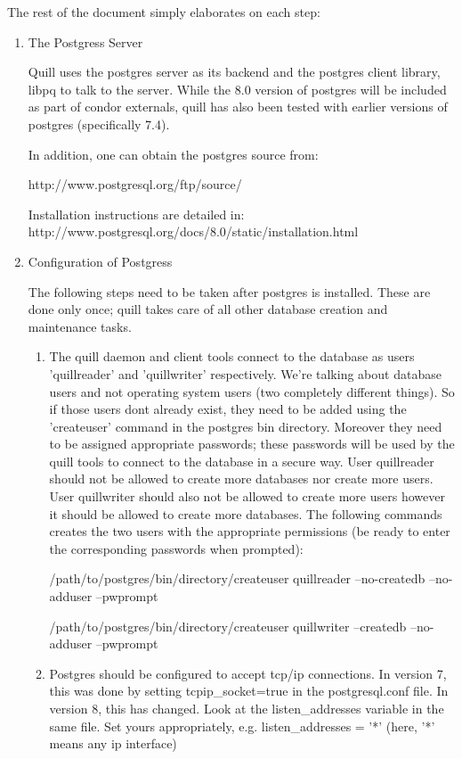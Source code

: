 The rest of the document simply elaborates on each step:

\begin{enumerate}
\item The Postgress Server

Quill uses the postgres server as its backend and the postgres client
library, libpq to talk to the server. While the 8.0 version of postgres
will be included as part of condor externals, quill has also been tested
with earlier versions of postgres (specifically 7.4).

In addition, one can obtain the postgres source from:

http://www.postgresql.org/ftp/source/

Installation instructions are detailed in:
http://www.postgresql.org/docs/8.0/static/installation.html

\item Configuration of Postgress

The following steps need to be taken after postgres is installed.  These
are done only once; quill takes care of all other database creation and
maintenance tasks.

\begin{enumerate}
\item The quill daemon and client tools connect to the database as
users 'quillreader' and 'quillwriter' respectively.  We're talking
about database users and not operating system users (two completely
different things).  So if those users dont already exist, they need to
be added using the 'createuser' command in the postgres bin directory.
Moreover they need to be assigned appropriate passwords; these passwords
will be used by the quill tools to connect to the database in a secure
way.  User quillreader should not be allowed to create more databases
nor create more users.  User quillwriter should also not be allowed to
create more users however it should be allowed to create more databases.
The following commands creates the two users with the appropriate
permissions (be ready to enter the corresponding passwords when prompted):

/path/to/postgres/bin/directory/createuser quillreader --no-createdb --no-adduser --pwprompt

/path/to/postgres/bin/directory/createuser quillwriter --createdb --no-adduser --pwprompt

\item Postgres should be configured to accept tcp/ip connections.  In version
7, this was done by setting tcpip\_socket=true in the postgresql.conf file.
In version 8, this has changed.  Look at the listen\_addresses variable
in the same file.  Set yours appropriately, e.g. listen\_addresses = '*'
(here, '*' means any ip interface)


\end{enumerate}
\end{enumerate}
